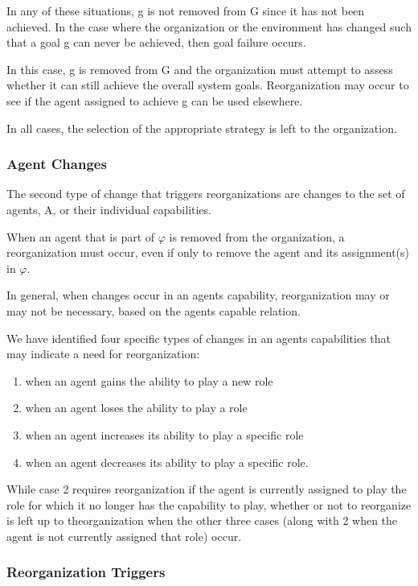 In any of these situations, g is not removed from G since it has not been achieved. In the case where the organization or the environment has changed such that a goal g can never be achieved, then goal failure occurs. 

In this case, g is removed from G and the organization must attempt to assess whether it can still achieve the overall system goals. Reorganization may occur to see if the agent assigned to achieve g can be used elsewhere. 

In all cases, the selection of the appropriate strategy is left to the organization\cite{omacs2}.
\subsubsection{Agent Changes}
The second type of change that triggers reorganizations are changes to the set of agents, A, or their individual capabilities\cite{omacs2}.

When an agent that is part of $\varphi$ is removed from the organization, a reorganization must occur, even if only to remove the agent and its assignment(s) in $\varphi$.

In general, when changes occur in an agents capability, reorganization may or may not be necessary, based on the agents capable relation. 

We have identified four specific types of changes in an agents capabilities that may indicate a need for reorganization: 

\begin{enumerate}
\item 
	when an agent gains the ability to play a new role
\item
	when an agent loses the ability to play a role
\item
	when an agent increases its ability to play a specific role
\item
	when an agent decreases its ability to play a specific role.
\end{enumerate}	
 
While case 2 requires reorganization if the agent is currently assigned to play the role for which it no longer has the capability to play, whether or not to reorganize is left up to theorganization when the other three cases (along with 2 when the agent is not currently assigned that role) occur\cite{omacs2}.


\subsubsection{Reorganization Triggers}

